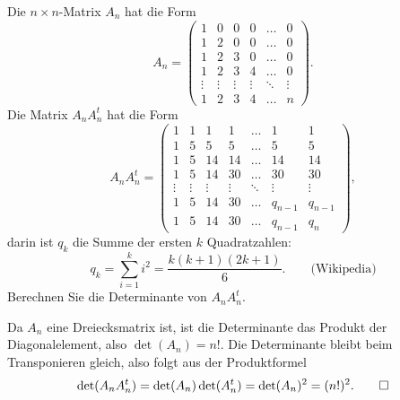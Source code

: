Die $n\times n$-Matrix $A_n$ hat die Form
\[
A_n=\begin{pmatrix}
     1&     0&     0&     0&\dots &     0\\
     1&     2&     0&     0&\dots &     0\\
     1&     2&     3&     0&\dots &     0\\
     1&     2&     3&     4&\dots &     0\\
\vdots&\vdots&\vdots&\vdots&\ddots&\vdots\\
     1&     2&     3&     4&\dots &     n
\end{pmatrix}.
\]
Die Matrix $A_nA_n^t$ hat die Form
\[
A_nA_n^t
=
\begin{pmatrix}
     1&     1&     1&     1& \dots&      1&      1\\
     1&     5&     5&     5& \dots&      5&      5\\
     1&     5&    14&    14& \dots&     14&     14\\
     1&     5&    14&    30& \dots&     30&     30\\
\vdots&\vdots&\vdots&\vdots&\ddots& \vdots& \vdots\\
     1&     5&    14&    30& \dots&q_{n-1}&q_{n-1}\\
     1&     5&    14&    30& \dots&q_{n-1}&    q_n
\end{pmatrix},
\]
darin ist $q_k$ die Summe der ersten $k$ Quadratzahlen:
\[
q_k=\sum_{i=1}^ki^2=\frac{k(k+1)(2k+1)}6.
\qquad
\text{(Wikipedia)}
\]
Berechnen Sie die Determinante von $A_nA^t_n$.


\begin{loesung}
Da $A_n$ eine Dreiecksmatrix ist, ist die Determinante das Produkt der
Diagonalelement, also $\det(A_n)=n!$. 
Die Determinante bleibt beim Transponieren gleich, also folgt aus der
Produktformel
\[
\det(A_nA_n^t)=\det(A_n)\det(A_n^t)=\det(A_n)^2=(n!)^2.
\qedhere
\]
\end{loesung}


